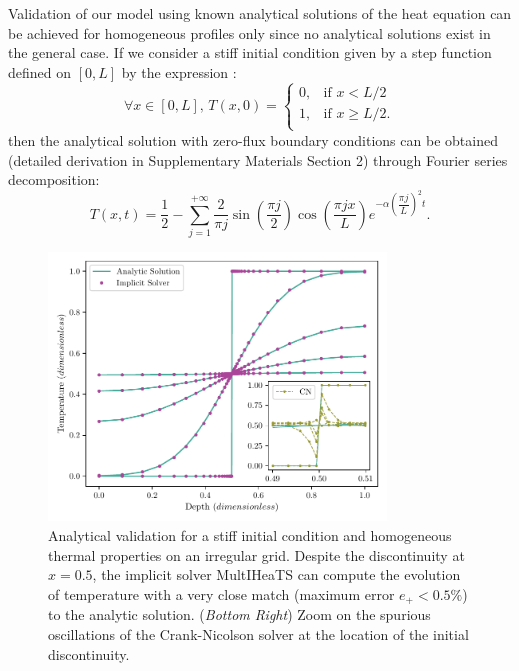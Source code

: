 \documentclass[sn-vancouver, Numbered]{sn-jnl}
\begin{document}
Validation of our model using known analytical solutions of the heat equation can be achieved for homogeneous profiles only since no analytical solutions exist in the general case.
If we consider a stiff initial condition given by a step function defined on $[0, L]$ by the expression :
\begin{equation}
    \forall x \in [0, L], \, T(x, 0) = \left\{
\begin{array}{ll}
0, & \text{if } x < L/2 \\
1, &  \text{if } x \geq L/2.\\
\end{array}
    \right.
\label{eq:step_fct}
\end{equation}
then the analytical solution with zero-flux boundary conditions can be obtained (detailed derivation in Supplementary Materials Section 2) %
through Fourier series decomposition:
\begin{equation}
    T(x, t) = \frac{1}{2} - \sum_{j=1}^{+\infty} \frac{2}{\pi j} \sin\left(\frac{\pi j}{2}\right) \cos\left(\frac{\pi j x}{L}\right)    e^{-\alpha \left(\dfrac{ \pi j}{L} \right)^2 t}.
\end{equation}

\begin{figure}[htpb]
	\centering
	\includegraphics[width=0.8\textwidth]{valid_ana.pdf}
	\caption{Analytical validation for a stiff initial condition and homogeneous thermal properties on an irregular grid. Despite the discontinuity at $x = 0.5 $, the implicit solver MultIHeaTS can compute the evolution of temperature with a very close match  (maximum error $e_+< 0.5\%$) to the analytic solution. (\textit{Bottom Right}) Zoom on the spurious oscillations of the Crank-Nicolson solver at the location of the initial discontinuity. }
	\label{fig:valid_ana}
\end{figure}
\end{document}

